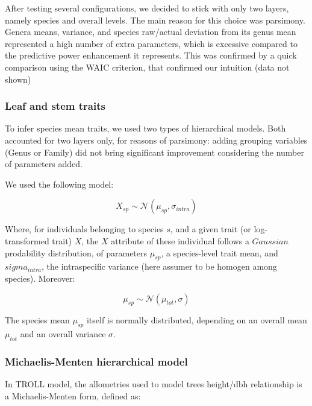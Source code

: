 \documentclass[12pt,]{article}
\theoremstyle{definition}
\theoremstyle{definition}
\theoremstyle{definition}
\theoremstyle{remark}
\begin{document}
After testing several configurations, we decided to stick with only two
layers, namely species and overall levels. The main reason for this
choice was parsimony. Genera means, variance, and species raw/actual
deviation from its genus mean represented a high number of extra
parameters, which is excessive compared to the predictive power
enhancement it represents. This was confirmed by a quick comparison
using the WAIC criterion, that confirmed our intuition (data not shown)

\subsubsection{Leaf and stem traits}\label{leaf-and-stem-traits}

To infer species mean traits, we used two types of hierarchical models.
Both accounted for two layers only, for reasons of parsimony: adding
grouping variables (Genus or Family) did not bring significant
improvement considering the number of parameters added.

We used the following model:

\begin{equation}
  X_{sp} \sim \mathcal{N}(\mu_{sp}, \sigma_{intra})
  \label{eq:leaftraits1}
\end{equation}

Where, for individuals belonging to species \(s\), and a given trait (or
log-transformed trait) \(X\), the \(X\) attribute of these individual
follows a \(Gaussian\) prodability distribution, of parameters
\(\mu_{sp}\), a species-level trait mean, and \(sigma_{intra}\), the
intraspecific variance (here assumer to be homogen among species).
Moreover:

\begin{equation}
  \mu_{sp} \sim \mathcal{N}(\mu_{tot}, \sigma)
  \label{eq:leaftraits2}
\end{equation}

The species mean \(\mu_{sp}\) itself is normally distributed, depending
on an overall mean \(\mu_{tot}\) and an overall variance \(\sigma\).

\subsubsection{Michaelis-Menten hierarchical
model}\label{michaelis-menten-hierarchical-model}

In TROLL model, the allometries used to model trees height/dbh
relationship is a Michaelis-Menten form, defined as:
\end{document}
